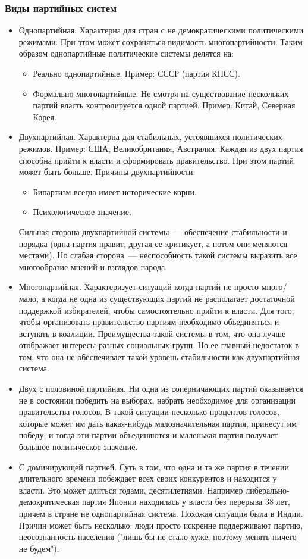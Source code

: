 \documentclass[12pt]{article}
\begin{document}
	\subsubsection{Виды партийных систем}
	\begin{itemize}
		\item Однопартийная. Характерна для стран с не демократическими политическими режимами. При этом может сохраняться видимость многопартийности. Таким образом однопартийные политические системы делятся на:
		\begin{itemize}
			\item Реально однопартийные. Пример: СССР (партия КПСС).
			\item Формально многопартийные. Не смотря на существование нескольких партий власть контролируется одной партией. Пример: Китай, Северная Корея.
		\end{itemize}
		\item Двухпартийная. Характерна для стабильных, устоявшихся политических режимов. Пример: США, Великобритания, Австралия. Каждая из двух партия способна прийти к власти и сформировать правительство. При этом партий может быть больше. Причины двухпартийности:
		\begin{itemize}
			\item Бипартизм всегда имеет исторические корни.
			\item Психологическое значение.
		\end{itemize}
		Сильная сторона двухпартийной системы~--- обеспечение стабильности и порядка (одна партия правит, другая ее критикует, а потом они меняются местами). Но слабая сторона~--- неспособность такой системы выразить все многообразие мнений и взглядов народа.
		\item Многопартийная. Характеризует ситуаций когда партий не просто много/мало, а когда не одна из существующих партий не располагает достаточной поддержкой избирателей, чтобы самостоятельно прийти к власти. Для того, чтобы организовать правительство партиям необходимо объединяться и вступать в коалиции. Преимущества такой системы в том, что она лучше отображает интересы разных социальных групп. Но ее главный недостаток в том, что она не обеспечивает такой уровень стабильности как двухпартийная система.
		\item Двух с половиной партийная. Ни одна из соперничающих партий оказывается не в состоянии победить на выборах, набрать необходимое для организации правительства голосов. В такой ситуации несколько процентов голосов, которые может им дать какая-нибудь малозначительная партия, принесут им победу; и тогда эти партии объединяются и маленькая партия получает большое политическое значение.
		\item С доминирующей партией. Суть в том, что одна и та же партия в течении длительного времени побеждает всех своих конкурентов и находится у власти. Это может длиться годами, десятилетиями. Например либерально-демократическая партия Японии находилась у власти без перерыва $38$ лет, причем в стране не однопартийная система. Похожая ситуация была в Индии. Причин может быть несколько: люди просто искренне поддерживают партию, неосознанность населения ("лишь бы не стало хуже, поэтому менять ничего не будем").
	\end{itemize}
\end{document}
